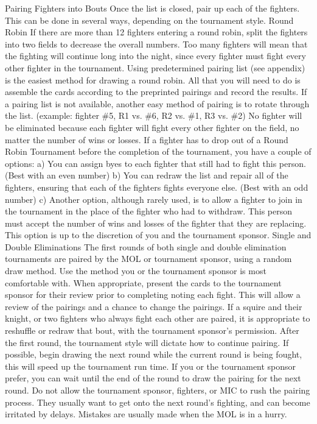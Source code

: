 \documentclass{article}
\begin{document}
Pairing Fighters into Bouts
Once the list is closed, pair up each of the fighters. This can be done in several ways, depending on the
tournament style.
Round Robin
If there are more than 12 fighters entering a round robin, split the fighters into two fields to decrease the
overall numbers. Too many fighters will mean that the fighting will continue long into the night, since
every fighter must fight every other fighter in the tournament.
Using predetermined pairing list (see appendix) is the easiest method for drawing a round robin. All that
you will need to do is assemble the cards according to the preprinted pairings and record the results. If a
pairing list is not available, another easy method of pairing is to rotate through the list. (example: fighter
\#5, R1 vs. \#6, R2 vs. \#1, R3 vs. \#2) No fighter will be eliminated because each fighter will fight every
other fighter on the field, no matter the number of wins or losses.
If a fighter has to drop out of a Round Robin Tournament before the completion of the tournament, you
have a couple of options:
a) You can assign byes to each fighter that still had to fight this person. (Best with an even number)
b) You can redraw the list and repair all of the fighters, ensuring that each of the fighters fights everyone
else. (Best with an odd number)
c) Another option, although rarely used, is to allow a fighter to join in the tournament in the place of the
fighter who had to withdraw. This person must accept the number of wins and losses of the fighter that
they are replacing. This option is up to the discretion of you and the tournament sponsor.
Single and Double Eliminations
The first rounds of both single and double elimination tournaments are paired by the MOL or tournament
sponsor, using a random draw method. Use the method you or the tournament sponsor is most
comfortable with.
When appropriate, present the cards to the tournament sponsor for their review prior to completing noting
each fight. This will allow a review of the pairings and a chance to change the pairings. If a squire and
their knight, or two fighters who always fight each other are paired, it is appropriate to reshuffle or redraw
that bout, with the tournament sponsor’s permission.
After the first round, the tournament style will dictate how to continue pairing. If possible, begin drawing
the next round while the current round is being fought, this will speed up the tournament run time. If you
or the tournament sponsor prefer, you can wait until the end of the round to draw the pairing for the next
round. Do not allow the tournament sponsor, fighters, or MIC to rush the pairing process. They usually
want to get onto the next round’s fighting, and can become irritated by delays. Mistakes are usually made
when the MOL is in a hurry.
\end{document}
